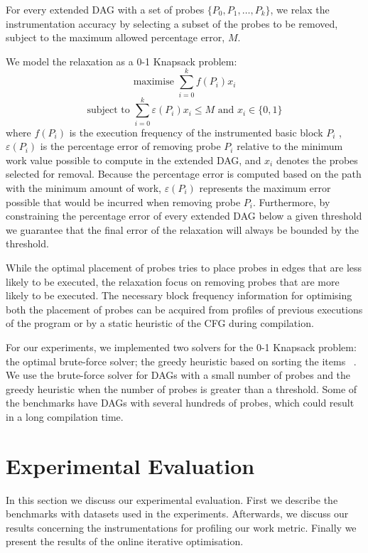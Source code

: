 \documentclass[sigplan,9pt]{acmart}
\begin{document}
For every extended DAG with a set of probes $\{P_0, P_1, \ldots, P_k\}$,
we relax the instrumentation accuracy by selecting a subset of the probes to be removed,
subject to the maximum allowed percentage error, $M$.

We model the relaxation as a 0-1 Knapsack problem:
\[
\textrm{maximise } \sum_{i=0}^{k} f(P_i)x_i
\]
\[
\textrm{subject to } \sum_{i=0}^{k} \varepsilon(P_i)x_i \leq M \textrm{ and } x_i\in\{0,1\}
\]
where $f(P_i)$ is the execution frequency of the instrumented basic block $P_i$
,$\varepsilon(P_i)$ is the percentage error of removing probe $P_i$ relative
to the minimum work value possible to compute in the extended DAG,
and $x_i$ denotes the probes selected for removal.
Because the percentage error is computed based on the path with the minimum
amount of work, $\varepsilon(P_i)$ represents the maximum error possible
that would be incurred when removing probe $P_i$.
Furthermore, by constraining the percentage error of every extended DAG below a
given threshold we guarantee that the final error of the relaxation will always
be bounded by the threshold.

While the optimal placement of probes tries to place probes in edges that are
less likely to be executed, the relaxation focus on removing probes that are
more likely to be executed.
The necessary block frequency information for optimising both the placement of
probes can be acquired from profiles of previous executions of the program or
by a static heuristic of the CFG during compilation.

For our experiments, we implemented two solvers for the 0-1 Knapsack problem:
the optimal brute-force solver;
the greedy heuristic based on sorting the items ~\cite{dantzig57}.
We use the brute-force solver for DAGs with a small number of probes and
the greedy heuristic when the number of probes is greater than a threshold.
Some of the benchmarks have DAGs with several hundreds of probes, which could
result in a long compilation time.

\section{Experimental Evaluation}

In this section we discuss our experimental evaluation.
First we describe the benchmarks with datasets used in the experiments.
Afterwards, we discuss our results concerning the instrumentations for profiling
our work metric.
Finally we present the results of the online iterative optimisation.
\end{document}
